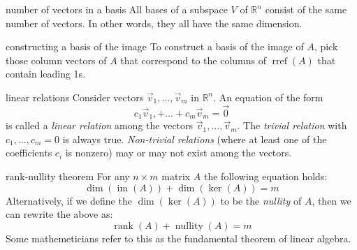 \documentclass[avery5371,grid,letterpaper]{flashcards}
\newcommand{\Rn}{\mathbb{R}^{n}}
\newcommand{\nbym}{n\times m}
\DeclareMathOperator{\rref}{rref}
\DeclareMathOperator{\im}{im}
\DeclareMathOperator{\rank}{rank}
\DeclareMathOperator{\nullity}{nullity}
\begin{document}
\begin{flashcard}[Theorem]{number of vectors in a basis}
All bases of a subspace $V$ of $\Rn$ consist of the same number of
vectors.  In other words, they all have the same dimension.
\end{flashcard}

\begin{flashcard}[Algorithm]{constructing a basis of the image}
To construct a basis of the image of $A$, pick those column vectors of
$A$ that correspond to the columns of $\rref(A)$ that contain leading 1s.
\end{flashcard}

\begin{flashcard}[Definition]{linear relations}
Consider vectors $\vec{v}_1, \ldots, \vec{v}_m$ in $\Rn$.  An equation
of the form
\begin{displaymath}
c_1 \vec{v}_1, + \ldots + c_m \vec{v}_m = \vec{0}
\end{displaymath}
is called a \textit{linear relation} among the vectors
$\vec{v}_1, \ldots, \vec{v}_m$.  The \textit{trivial relation} with
$c_1, \ldots ,c_m = 0$ is always true.  \textit{Non-trivial relations}
(where at least one of the coefficients $c_i$ is nonzero) may or may not
exist among the vectors.
\end{flashcard}

\begin{flashcard}[Theorem]{rank-nullity theorem}
For any $\nbym$ matrix $A$ the following equation holds:
\begin{displaymath}
\dim(\im(A)) + \dim(\ker(A)) = m
\end{displaymath}
Alternatively, if we define the $\dim(\ker(A))$ to be the \textit{nullity}
of $A$, then we can rewrite the above as:
\begin{displaymath}
\rank(A) + \nullity(A) = m
\end{displaymath}
Some mathemeticians refer to this as the fundamental theorem of linear algebra.
\end{flashcard}
\end{document}
